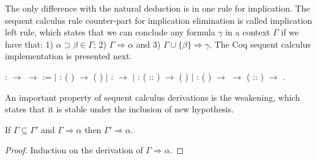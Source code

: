 The only difference with the natural deduction is in one rule for implication. The
sequent calculus rule counter-part for implication elimination is called
implication left rule, which states that we can conclude any formula $\gamma$
in a context $\Gamma$ if we have that: 1) $\alpha \supset \beta \in \Gamma$;
2) $\Gamma \Rightarrow \alpha$ and 3) $\Gamma \cup \{\beta\} \Rightarrow
\gamma$. The Coq sequent calculus implementation is presented next.
 \begin{coqdoccode}
\coqdocemptyline
\coqdocnoindent
{}  : \coqdocvar{$\Gamma$} \ensuremath{\rightarrow} \coqdocvar{$\alpha$} \ensuremath{\rightarrow}  :=\coqdoceol
\coqdocnoindent
\ensuremath{|}   \coqdoceol
\coqdocindent{1.00em}
: ( ) \coqdocvar{$\in$}  \ensuremath{\rightarrow}   ( )\coqdoceol
\coqdocnoindent
\ensuremath{|}   \coqdoceol
\coqdocindent{1.00em}
:  \coqdocvar{$\in$}  \ensuremath{\rightarrow}   \coqdoceol
\coqdocnoindent
\ensuremath{|}    \coqdoceol
\coqdocindent{1.00em}
:  ( :: )  \ensuremath{\rightarrow}\coqdoceol
\coqdocindent{2.00em}
  (  )\coqdoceol
\coqdocnoindent
\ensuremath{|}     \coqdoceol
\coqdocindent{1.00em}
: (  ) \coqdocvar{$\in$}  \ensuremath{\rightarrow}\coqdoceol
\coqdocindent{2.00em}
   \ensuremath{\rightarrow}\coqdoceol
\coqdocindent{2.00em}
 ( :: )  \ensuremath{\rightarrow}\coqdoceol
\coqdocindent{2.00em}
  .\coqdoceol
\coqdocemptyline
\end{coqdoccode}
An important property of sequent calculus derivations is the weakening, which
states that it is stable under the inclusion of new hypothesis.

\begin{Lemma}[Weakening]\label{lemma:weak}
If $\Gamma \subseteq \Gamma'$ and $\Gamma\Rightarrow \alpha$ then $\Gamma'\Rightarrow \alpha$.
\end{Lemma}
\begin{proof}
  Induction on the derivation of $\Gamma\Rightarrow\alpha$.
\end{proof}

